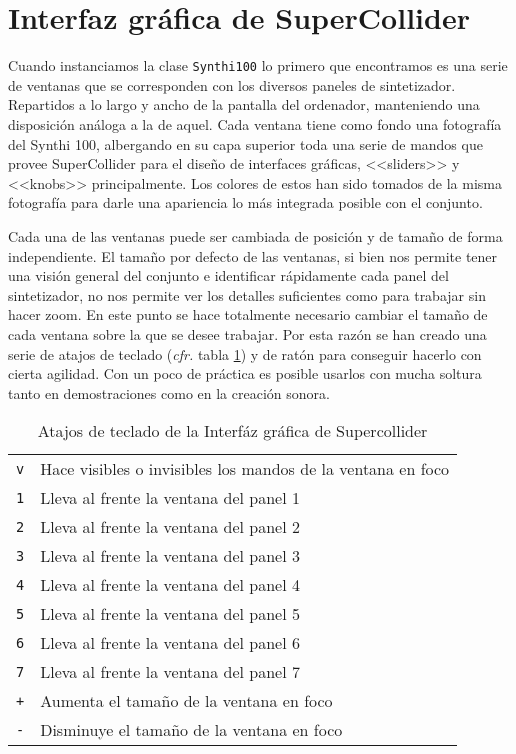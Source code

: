 \section{Interfaz gráfica de SuperCollider}
Cuando instanciamos la clase \texttt{Synthi100} lo primero que encontramos es una serie de ventanas que se corresponden con los diversos paneles de sintetizador. Repartidos a lo largo y ancho de la pantalla del ordenador, manteniendo una disposición análoga a la de aquel. Cada ventana tiene como fondo una fotografía del Synthi 100, albergando en su capa superior toda una serie de mandos que provee SuperCollider para el diseño de interfaces gráficas, <<sliders>> y <<knobs>> principalmente. Los colores de estos han sido tomados de la misma fotografía para darle una apariencia lo más integrada posible con el conjunto. 
	
Cada una de las ventanas puede ser cambiada de posición y de tamaño de forma independiente. El tamaño por defecto de las ventanas, si bien nos permite tener una visión general del conjunto e identificar rápidamente cada panel del sintetizador, no nos permite ver los detalles suficientes como para trabajar sin hacer zoom. En este punto se hace totalmente necesario cambiar el tamaño de cada ventana sobre la que se desee trabajar. Por esta razón se han creado una serie de atajos de teclado (\textit{cfr.} tabla \ref{table:atajos})  y de ratón para conseguir hacerlo con cierta agilidad. Con un poco de práctica es posible usarlos con mucha soltura tanto en demostraciones como en la creación sonora.
	

\begin{table}
	\begin{center}
		\begin{tabular}{ |l|l| }
  		\hline
  		\texttt{v} & Hace visibles o invisibles los mandos de la ventana en foco\\
  		\texttt{1} & Lleva al frente la ventana del panel 1\\
  		\texttt{2} & Lleva al frente la ventana del panel 2\\
  		\texttt{3} & Lleva al frente la ventana del panel 3\\
  		\texttt{4} & Lleva al frente la ventana del panel 4\\
  		\texttt{5} & Lleva al frente la ventana del panel 5\\
  		\texttt{6} & Lleva al frente la ventana del panel 6\\
  		\texttt{7} & Lleva al frente la ventana del panel 7\\
  		\texttt{+} & Aumenta el tamaño de la ventana en foco\\
  		\texttt{-} & Disminuye el tamaño de la ventana en foco\\
  		\hline
		\end{tabular}
		\caption[Atajos de teclado]{Atajos de teclado de la Interfáz gráfica de Supercollider}
		\label{table:atajos}
	\end{center}
\end{table}

